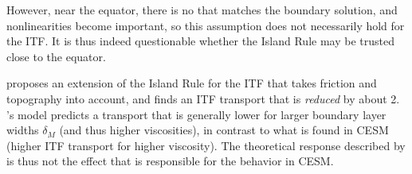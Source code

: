 
However, near the equator, there is no  that matches the boundary solution, and nonlinearities become important, so this assumption does not necessarily hold for the \ac{ITF}. It is thus indeed questionable whether the Island Rule may be trusted close to the equator.

\parabreak

\citet{wajsowicz} proposes an extension of the Island Rule for the \ac{ITF} that takes friction and topography into account, and finds an \ac{ITF} transport that is \emph{reduced} by about \SI{2}{\sv}. \citeauthor{wajsowicz}'s model predicts a transport that is generally lower for larger boundary layer widths \(\delta_M\) (and thus higher viscosities), in contrast to what is found in \ac{CESM} (higher \ac{ITF} transport for higher viscosity). The theoretical response described by \citeauthor{wajsowicz} is thus not the effect that is responsible for the behavior in \ac{CESM}.
